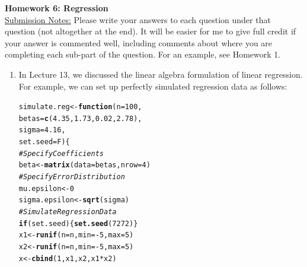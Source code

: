 \documentclass{article}\usepackage[]{graphicx}\usepackage[]{xcolor}
\makeatletter
\newcommand{\hlnum}[1]{\textcolor[rgb]{0.686,0.059,0.569}{#1}}%
\newcommand{\hlcom}[1]{\textcolor[rgb]{0.678,0.584,0.686}{\textit{#1}}}%
\newcommand{\hlopt}[1]{\textcolor[rgb]{0,0,0}{#1}}%
\newcommand{\hldef}[1]{\textcolor[rgb]{0.345,0.345,0.345}{#1}}%
\newcommand{\hlkwa}[1]{\textcolor[rgb]{0.161,0.373,0.58}{\textbf{#1}}}%
\newcommand{\hlkwb}[1]{\textcolor[rgb]{0.69,0.353,0.396}{#1}}%
\newcommand{\hlkwc}[1]{\textcolor[rgb]{0.333,0.667,0.333}{#1}}%
\newcommand{\hlkwd}[1]{\textcolor[rgb]{0.737,0.353,0.396}{\textbf{#1}}}%
\newenvironment{kframe}{%
 \def\at@end@of@kframe{}%
 \ifinner\ifhmode%
  \def\at@end@of@kframe{\end{minipage}}%
  \begin{minipage}{\columnwidth}%
 \fi\fi%
 \def\FrameCommand##1{\hskip\@totalleftmargin \hskip-\fboxsep
 \colorbox{shadecolor}{##1}\hskip-\fboxsep
     \hskip-\linewidth \hskip-\@totalleftmargin \hskip\columnwidth}%
 \MakeFramed {\advance\hsize-\width
   \@totalleftmargin\z@ \linewidth\hsize
   \@setminipage}}%
 {\par\unskip\endMakeFramed%
 \at@end@of@kframe}
\newenvironment{knitrout}{}{} %
\makeatother
\begin{document}
\noindent\textbf{Homework 6: Regression}\\
\noindent\makebox[\linewidth]{\rule{\textwidth}{0.4pt}}
\noindent\underline{Submission Notes:} Please write your answers to each 
question under that question (not altogether at the end). It will be easier for 
me to give full credit if your answer is commented well, including comments 
about where you are completing each sub-part of the question. For an example,
see Homework 1.\\
\noindent\makebox[\linewidth]{\rule{\textwidth}{0.4pt}}


\begin{enumerate}
  \item In Lecture 13, we discussed the linear algebra formulation of linear regression.
  For example, we can set up perfectly simulated regression data as follows:
\begin{knitrout}\scriptsize
{}\color{fgcolor}\begin{kframe}
\begin{alltt}
\hldef{simulate.reg} \hlkwb{<-} \hlkwa{function}\hldef{(}\hlkwc{n}\hldef{=}\hlnum{100}\hldef{,}
                         \hlkwc{betas}\hldef{=}\hlkwd{c}\hldef{(}\hlnum{4.35}\hldef{,} \hlnum{1.73}\hldef{,} \hlnum{0.02}\hldef{,} \hlnum{2.78}\hldef{),}
                         \hlkwc{sigma}\hldef{=}\hlnum{4.16}\hldef{,}
                         \hlkwc{set.seed}\hldef{=F)\{}
  \hlcom{# Specify Coefficients}
  \hldef{beta} \hlkwb{<-} \hlkwd{matrix}\hldef{(}\hlkwc{data} \hldef{= betas,} \hlkwc{nrow}\hldef{=}\hlnum{4}\hldef{)}
  \hlcom{# Specify Error Distribution}
  \hldef{mu.epsilon} \hlkwb{<-} \hlnum{0}
  \hldef{sigma.epsilon}\hlkwb{<-}\hlkwd{sqrt}\hldef{(sigma)}
  \hlcom{# Simulate Regression Data}
  \hlkwa{if}\hldef{(set.seed)\{}\hlkwd{set.seed}\hldef{(}\hlnum{7272}\hldef{)\}}
  \hldef{x1} \hlkwb{<-} \hlkwd{runif}\hldef{(}\hlkwc{n}\hldef{=n,} \hlkwc{min}\hldef{=}\hlopt{-}\hlnum{5}\hldef{,} \hlkwc{max}\hldef{=}\hlnum{5}\hldef{)}
  \hldef{x2} \hlkwb{<-} \hlkwd{runif}\hldef{(}\hlkwc{n}\hldef{=n,} \hlkwc{min}\hldef{=}\hlopt{-}\hlnum{5}\hldef{,} \hlkwc{max}\hldef{=}\hlnum{5}\hldef{)}
  \hldef{x} \hlkwb{<-} \hlkwd{cbind}\hldef{(}\hlnum{1}\hldef{, x1, x2, x1}\hlopt{*}\hldef{x2)}

\end{alltt}
\end{kframe}
\end{knitrout}
\end{enumerate}
\end{document}
